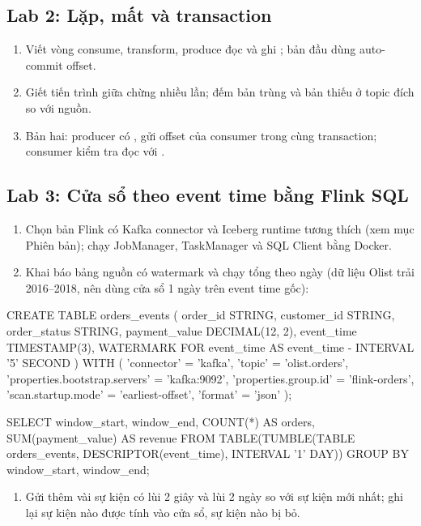 \subsection{Lab 2: Lặp, mất và transaction}
\begin{enumerate}
  \item Viết vòng consume, transform, produce đọc  và ghi ; bản đầu dùng auto-commit offset.
  \item Giết tiến trình giữa chừng nhiều lần; đếm bản trùng và bản thiếu ở topic đích so với nguồn.
  \item Bản hai: producer có , gửi offset của consumer trong cùng transaction; consumer kiểm tra đọc với .
\end{enumerate}

\subsection{Lab 3: Cửa sổ theo event time bằng Flink SQL}
\begin{enumerate}
  \item Chọn bản Flink có Kafka connector và Iceberg runtime tương thích (xem mục Phiên bản); chạy JobManager, TaskManager và SQL Client bằng Docker.
  \item Khai báo bảng nguồn có watermark và chạy tổng theo ngày (dữ liệu Olist trải 2016--2018, nên dùng cửa sổ 1 ngày trên event time gốc):
\end{enumerate}
\begin{codeblock}
CREATE TABLE orders_events (
  order_id      STRING,
  customer_id   STRING,
  order_status  STRING,
  payment_value DECIMAL(12, 2),
  event_time    TIMESTAMP(3),
  WATERMARK FOR event_time AS event_time - INTERVAL '5' SECOND
) WITH (
  'connector' = 'kafka',
  'topic' = 'olist.orders',
  'properties.bootstrap.servers' = 'kafka:9092',
  'properties.group.id' = 'flink-orders',
  'scan.startup.mode' = 'earliest-offset',
  'format' = 'json'
);

SELECT window_start, window_end, COUNT(*) AS orders, SUM(payment_value) AS revenue
FROM TABLE(TUMBLE(TABLE orders_events, DESCRIPTOR(event_time), INTERVAL '1' DAY))
GROUP BY window_start, window_end;
\end{codeblock}
\begin{enumerate}[resume]
  \item Gửi thêm vài sự kiện có  lùi 2 giây và lùi 2 ngày so với sự kiện mới nhất; ghi lại sự kiện nào được tính vào cửa sổ, sự kiện nào bị bỏ.
\end{enumerate}

